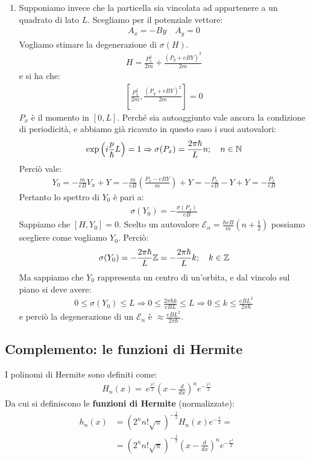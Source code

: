 \documentclass[../../FisicaTeorica.tex]{subfiles}
\begin{document}
\begin{enumerate}
\item Supponiamo invece che la particella sia vincolata ad appartenere a un quadrato di lato $L$. Scegliamo per il potenziale vettore:
\begin{align*}
A_x = -By\quad A_y = 0
\end{align*}
Vogliamo stimare la degenerazione di $\sigma(H)$.
\begin{align*}
H=\frac{P_x^2}{2m} + \frac{(P_y + eB Y)^2}{2m}
\end{align*}
e si ha che:
\begin{align*}
\left[\frac{P_x^2}{2m}, \frac{(P_y + eBY)^2}{2m}\right] =0
\end{align*}
$P_x$ è il momento in $[0, L]$. Perché sia autoaggiunto vale ancora la condizione di periodicità, e abbiamo già ricavato in questo caso i suoi autovalori:
\begin{align*}
\exp \left(i\frac{p}{\hbar}L\right)=1\Rightarrow \sigma(P_x)=\frac{2\pi\hbar}{L}n; \quad n \in \mathbb{N}
\end{align*}
Perciò vale:
\begin{align*}
Y_0 = -\frac{m}{eB} V_x + Y = -\frac{m}{eB}\left(\frac{P_x-eBY}{m}\right) + Y = -\frac{P_x}{eB} -Y + Y = -\frac{P_x}{eB}
\end{align*}
Pertanto lo spettro di $Y_0$ è pari a:
\begin{align*}
\sigma(Y_0) = -\frac{\sigma(P_x)}{eB}
\end{align*}
Sappiamo che $[H, Y_0]=0$. Scelto un autovalore $\mathcal{E}_n = \frac{\hbar e B}{m}\left(n+\frac{1}{2}\right)$ possiamo scegliere come vogliamo $Y_0$. Perciò:
\begin{align*}
\sigma(Y_0) = -\frac{2\pi \hbar}{L}\mathbb{Z}= -\frac{2\pi\hbar}{L}k; \quad k\in \mathbb{Z}
\end{align*}
Ma sappiamo che $Y_0$ rappresenta un centro di un'orbita, e dal vincolo sul piano si deve avere:
\begin{align*}
0 \leq \sigma(Y_0) \leq L \Rightarrow  0\leq \frac{2\pi\hbar k}{eBL}\leq L \Rightarrow 0 \leq k \leq \frac{eBL^2}{2\pi \hbar}
\end{align*}
e perciò la degenerazione di un $\mathcal{E}_n$ è $\approx \frac{eBL^2}{2\pi\hbar}$.
\end{enumerate}

\subsection{Complemento: le funzioni di Hermite}
I polinomi di Hermite sono definiti come:
\begin{align*}
H_n(x) =\ e^{\frac{x^2}{2}}\left(x-\frac{d}{dx}\right)^n e^{-\frac{x^2}{2}}
\end{align*}
Da cui si definiscono le \textbf{funzioni di Hermite} (normalizzate):
\begin{align*}
h_n(x) &= \left( 2^n n! \sqrt{\pi}\right)^{-\frac{1}{2}} H_n(x) e^{-\frac{x}{2}} =\\
&= (2^n n! \sqrt{\pi})^{-\frac{1}{2}} \left(x-\frac{d}{dx}\right)^n e^{-\frac{x^2}{2}}
\end{align*}
\end{document}
